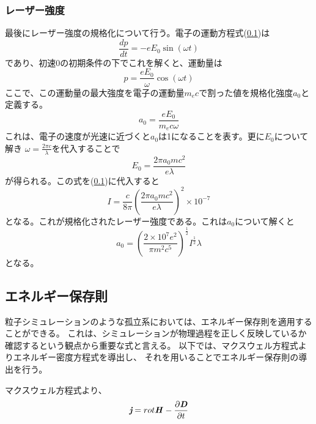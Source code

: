 \documentclass[a4paper,11pt,titlepage]{jsarticle}
\begin{document}
  \subsubsection{レーザー強度}
  最後にレーザー強度の規格化について行う。電子の運動方程式(\ref{})は
  \begin{equation}
    \label{eq:3-2-18}
    \frac{dp}{dt}=-eE_0 \sin ( \omega t )  
  \end{equation}
  であり、初速0の初期条件の下でこれを解くと、運動量は
  \begin{equation}
    \label{eq:3-2-19}
    p=\frac{eE_0}{\omega} \cos (\omega t)
  \end{equation}
  ここで、この運動量の最大強度を電子の運動量$m_e c$で割った値を規格化強度$a_0$と定義する。
  \begin{equation}
    \label{eq:3-2-20}
    a_0 = \frac{e E_0}{m_e c \omega}
  \end{equation}
  これは、電子の速度が光速に近づくと$a_0$は1になることを表す。更に$E_0$について解き
  $\omega = \frac{2\pi c}{\lambda}$を代入することで
  \begin{equation}
    \label{eq:3-2-21}
    E_0 = \frac{2\pi a_0 mc^2}{e\lambda}
  \end{equation}
  が得られる。この式を(\ref{})に代入すると
  \begin{equation}
    \label{eq:3-2-22}
    I=\frac{c}{8\pi} \left(\frac{2\pi a_0 m c^2}{e\lambda}\right)^2 \times 10^{-7}
  \end{equation}
  となる。これが規格化されたレーザー強度である。これは$a_0$について解くと
  \begin{equation}
    \label{eq:3-2-23}
    a_0 = \left( \frac{2\times 10^7 e^2}{\pi m^2 c^5}\right) ^{\frac{1}{2}} I^{\frac{1}{2}}\lambda
  \end{equation}
  となる。


  \subsection{エネルギー保存則}
  粒子シミュレーションのような孤立系においては、エネルギー保存則を適用することができる。
  これは、シミュレーションが物理過程を正しく反映しているか確認するという観点から重要な式と言える。
  以下では、マクスウェル方程式よりエネルギー密度方程式を導出し、
  それを用いることでエネルギー保存則の導出を行う。

  マクスウェル方程式より、
  \begin{equation}
    \label{eq:3-3-1}
    \textit{\textbf{j}} = rot \textbf{\textit{H}} - \frac{\partial \textit{\textbf{D}} }{\partial t} 
  \end{equation}
\end{document}
